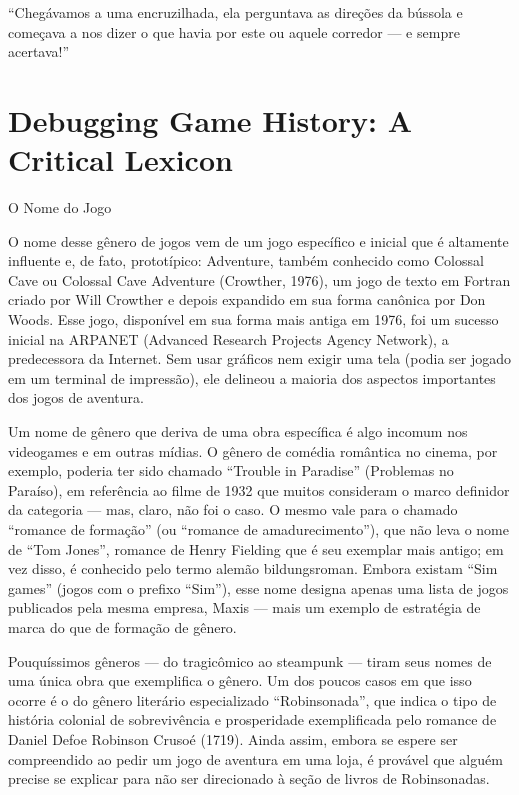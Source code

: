 \documentclass[12pt,a4paper]{article}
\begin{document}
“Chegávamos a uma encruzilhada, ela perguntava as direções da bússola e começava a nos dizer o que havia por este ou aquele corredor — e sempre acertava!”

\section{Debugging Game History: A Critical Lexicon}
\textcite{lowood2024debugging}
O Nome do Jogo

O nome desse gênero de jogos vem de um jogo específico e inicial que é altamente influente e, de fato, prototípico: Adventure, também conhecido como Colossal Cave ou Colossal Cave Adventure (Crowther, 1976), um jogo de texto em Fortran criado por Will Crowther e depois expandido em sua forma canônica por Don Woods. Esse jogo, disponível em sua forma mais antiga em 1976, foi um sucesso inicial na ARPANET (Advanced Research Projects Agency Network), a predecessora da Internet. Sem usar gráficos nem exigir uma tela (podia ser jogado em um terminal de impressão), ele delineou a maioria dos aspectos importantes dos jogos de aventura.

Um nome de gênero que deriva de uma obra específica é algo incomum nos videogames e em outras mídias. O gênero de comédia romântica no cinema, por exemplo, poderia ter sido chamado “Trouble in Paradise” (Problemas no Paraíso), em referência ao filme de 1932 que muitos consideram o marco definidor da categoria — mas, claro, não foi o caso. O mesmo vale para o chamado “romance de formação” (ou “romance de amadurecimento”), que não leva o nome de “Tom Jones”, romance de Henry Fielding que é seu exemplar mais antigo; em vez disso, é conhecido pelo termo alemão bildungsroman.
Embora existam “Sim games” (jogos com o prefixo “Sim”), esse nome designa apenas uma lista de jogos publicados pela mesma empresa, Maxis — mais um exemplo de estratégia de marca do que de formação de gênero.

Pouquíssimos gêneros — do tragicômico ao steampunk — tiram seus nomes de uma única obra que exemplifica o gênero. Um dos poucos casos em que isso ocorre é o do gênero literário especializado “Robinsonada”, que indica o tipo de história colonial de sobrevivência e prosperidade exemplificada pelo romance de Daniel Defoe Robinson Crusoé (1719). Ainda assim, embora se espere ser compreendido ao pedir um jogo de aventura em uma loja, é provável que alguém precise se explicar para não ser direcionado à seção de livros de Robinsonadas.
\end{document}
